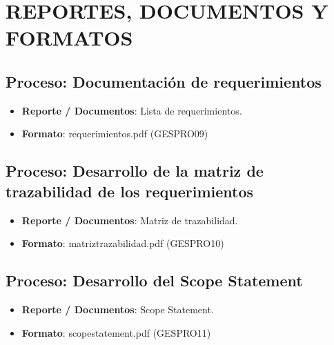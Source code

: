 \chapter{REPORTES, DOCUMENTOS Y FORMATOS}
%
\section{Proceso: Documentaci\'on de requerimientos}
%
\begin{itemize}
	\item \textbf{Reporte / Documentos}: Lista de requerimientos.
	\item \textbf{Formato}: requerimientos.pdf (GESPRO09)
\end{itemize}
%
\section{Proceso: Desarrollo de la matriz de trazabilidad de los requerimientos}
%
\begin{itemize}
	\item \textbf{Reporte / Documentos}: Matriz de trazabilidad.
	\item \textbf{Formato}: matriztrazabilidad.pdf (GESPRO10)
\end{itemize}
%
\section{Proceso: Desarrollo del Scope Statement}
%
\begin{itemize}
	\item \textbf{Reporte / Documentos}: Scope Statement.
	\item \textbf{Formato}: scopestatement.pdf (GESPRO11)
\end{itemize}
